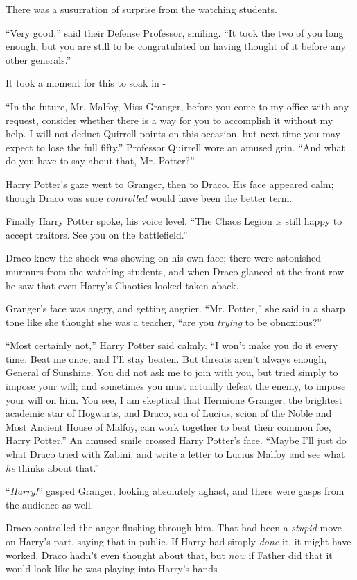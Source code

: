 There was a susurration of surprise from the watching students.

``Very good,'' said their Defense Professor, smiling. ``It took the two of you long enough, but you are still to be congratulated on having thought of it before any other generals.''

It took a moment for this to soak in -

``In the future, Mr. Malfoy, Miss Granger, before you come to my office with any request, consider whether there is a way for you to accomplish it without my help. I will not deduct Quirrell points on this occasion, but next time you may expect to lose the full fifty.'' Professor Quirrell wore an amused grin. ``And what do you have to say about that, Mr. Potter?''

Harry Potter's gaze went to Granger, then to Draco. His face appeared calm; though Draco was sure \emph{controlled} would have been the better term.

Finally Harry Potter spoke, his voice level. ``The Chaos Legion is still happy to accept traitors. See you on the battlefield.''

Draco knew the shock was showing on his own face; there were astonished murmurs from the watching students, and when Draco glanced at the front row he saw that even Harry's Chaotics looked taken aback.

Granger's face was angry, and getting angrier. ``Mr. Potter,'' she said in a sharp tone like she thought she was a teacher, ``are you \emph{trying} to be obnoxious?''

``Most certainly not,'' Harry Potter said calmly. ``I won't make you do it every time. Beat me once, and I'll stay beaten. But threats aren't always enough, General of Sunshine. You did not ask me to join with you, but tried simply to impose your will; and sometimes you must actually defeat the enemy, to impose your will on him. You see, I am skeptical that Hermione Granger, the brightest academic star of Hogwarts, and Draco, son of Lucius, scion of the Noble and Most Ancient House of Malfoy, can work together to beat their common foe, Harry Potter.'' An amused smile crossed Harry Potter's face. ``Maybe I'll just do what Draco tried with Zabini, and write a letter to Lucius Malfoy and see what \emph{he} thinks about that.''

``\emph{Harry!}'' gasped Granger, looking absolutely aghast, and there were gasps from the audience as well.

Draco controlled the anger flushing through him. That had been a \emph{stupid} move on Harry's part, saying that in public. If Harry had simply \emph{done} it, it might have worked, Draco hadn't even thought about that, but \emph{now} if Father did that it would look like he was playing into Harry's hands -

